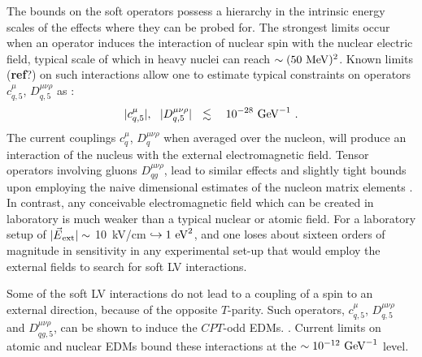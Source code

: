 \documentclass[12pt,preprintnumbers,nofootinbib]{revtex4}
\begin{document}
	The bounds on the soft operators possess a hierarchy in the 
	intrinsic energy scales of the effects where they can be probed for.
	The strongest limits occur when an operator induces the interaction 
	of nuclear spin with the nuclear electric field, typical scale of which
	in heavy nuclei can reach $ \sim (50~{\rm MeV})^2 $.
	Known limits ({\bf ref}?) on such interactions allow one to estimate typical constraints on operators 
$ c^\mu_{q,5} $, $ D^{\mu\nu\rho}_{q,5} $ as
\cite{Bolokhov:2005cj}:
\begin{equation}
\label{nucl_spin}
	|c^\mu_{q,5}|,~~ |D^{\mu\nu\rho}_{q,5}| ~~\lesssim~~~
	10^{-28}~{\rm GeV}^{-1}~.
\end{equation}
	The current couplings $ c_q^\mu $, $ D^{\mu\nu\rho}_q $  when averaged over the nucleon, 
	will produce an interaction of the nucleus with the external electromagnetic field.
	Tensor operators
	involving gluons $ D^{\mu\nu\rho}_{qg} $, lead to similar effects and slightly tight bounds upon 
	employing the naive dimensional estimates of the nucleon matrix elements
\cite{Manohar:1983md}.
	In contrast, any conceivable electromagnetic field which can be created in laboratory
	is much weaker than a typical nuclear or atomic field.
	For a laboratory setup of $ |\vec{E}{}_{\rm ext}| \sim $ 10~kV/cm 
	$ \hookrightarrow 1~{\rm eV}^2 $, 
	and one loses about sixteen orders of magnitude in sensitivity in any experimental set-up that 
would employ the external fields to search for soft LV interactions.
	
	Some of the soft LV interactions do not lead to a coupling of a spin to an external direction, 
because of the opposite $T$-parity.   Such operators, $ c^\mu_{q,5} $, $ D^{\mu\nu\rho}_{q,5} $ and
	$ D^{\mu\nu\rho}_{qg,5} $,  can be shown to induce the $CPT$-odd EDMs.
\cite{Bolokhov_EDM}.
	Current limits on atomic and nuclear EDMs bound these interactions
	at the $ \sim 10^{-12}~{\rm GeV}^{-1} $ 
	level.
	
\end{document}
